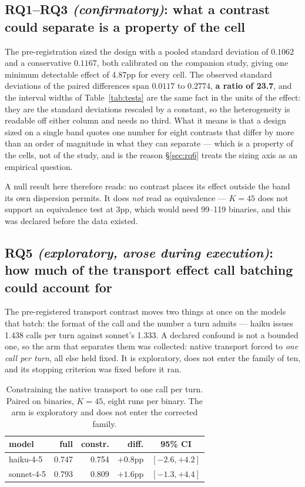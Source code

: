 \subsection{RQ1--RQ3 \emph{(confirmatory)}: what a contrast could separate is a property of the cell}

The pre-registration sized the design with a pooled standard deviation of $0.1062$ and a conservative
$0.1167$, both calibrated on the companion study, giving one minimum detectable effect of 4.87pp for every
cell. The observed standard deviations of the paired differences span $0.0117$ to $0.2774$, \textbf{a ratio
of 23.7}, and the interval widths of Table~\ref{tab:tests} are the same fact in the units of the effect:
they are the standard deviations rescaled by a constant, so the heterogeneity is readable off either
column and needs no third. What it means is that a design sized on a single band quotes one number for
eight contrasts that differ by more than an order of magnitude in what they can separate --- which is a
property of the cells, not of the study, and is the reason \S\ref{sec:rq6} treats the sizing axis as an
empirical question.

A null result here therefore reads: no contrast places its effect outside the band its own dispersion
permits. It does \emph{not} read as equivalence --- $K=45$ does not support an equivalence test at 3pp,
which would need 99--119 binaries, and this was declared before the data existed.

\subsection{RQ5 \emph{(exploratory, arose during execution)}: how much of the transport effect call
batching could account for}
\label{sec:rq5}

The pre-registered transport contrast moves two things at once on the models that batch: the format of
the call and the number a turn admits --- haiku issues 1.438 calls per turn against sonnet's 1.333. A
declared confound is not a bounded one, so the arm that separates them was collected: native transport
forced to \emph{one call per turn}, all else held fixed. It is exploratory, does not enter the family of
ten, and its stopping criterion was fixed before it ran.

\begin{table}[t]
\centering
\caption{Constraining the native transport to one call per turn. Paired on binaries, $K=45$,
eight runs per binary. The arm is exploratory and does not enter the corrected family.}
\label{tab:batching}
\footnotesize
\setlength{\tabcolsep}{4pt}
\begin{tabular}{@{}lrrrc@{}}
\toprule
model & full & constr. & diff. & 95\% CI \\
\midrule
haiku-4-5 & 0.747 & 0.754 & $+0.8$pp & $[-2.6, +4.2]$ \\
sonnet-4-5 & 0.793 & 0.809 & $+1.6$pp & $[-1.3, +4.4]$ \\
\bottomrule
\end{tabular}
\end{table}

